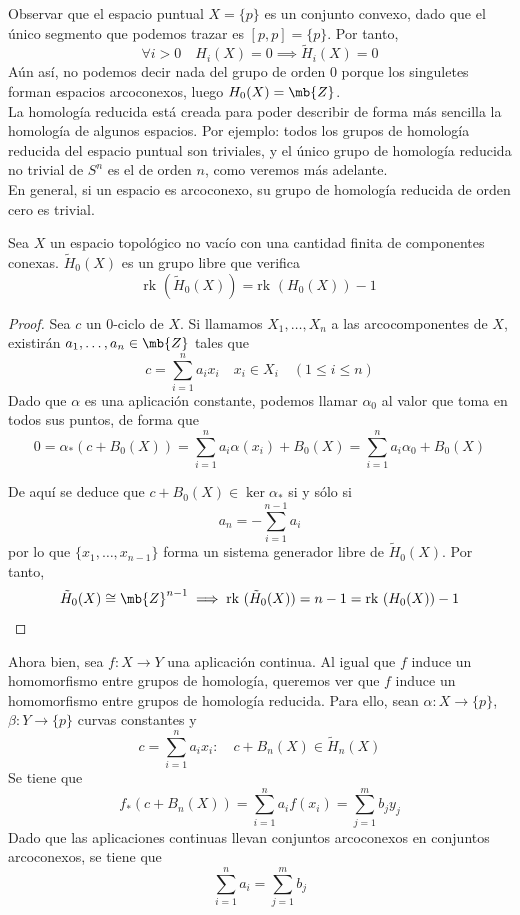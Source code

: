 Observar que el espacio puntual $X=\{p\}$ es un conjunto convexo, dado que el único segmento que podemos trazar es $[p,p]=\{p\}$. Por tanto, $$\forall i > 0 \quad H_i(X)=0 \implies \tilde{H}_i(X) =0$$ Aún así, no podemos decir nada del grupo de orden 0 porque los singuletes forman espacios arcoconexos, luego $H_0(X)=\mb{Z}$.
\\

La homología reducida está creada para poder describir de forma más sencilla la homología de algunos espacios. Por ejemplo: todos los grupos de homología reducida del espacio puntual son triviales, y el único grupo de homología reducida no trivial de $S^n$ es el de orden $n$, como veremos más adelante.
\\

En general, si un espacio es arcoconexo, su grupo de homología reducida de orden cero es trivial.

\begin{prop}
Sea $X$ un espacio topológico no vacío con una cantidad finita de componentes conexas. $\tilde{H}_0(X)$ es un grupo libre que verifica $$\mbox{rk }(\tilde{H}_0(X))=\mbox{rk }(H_0(X))-1$$
\end{prop}

\begin{proof}
Sea $c$ un $0$-ciclo de $X$. Si llamamos $X_1,\dots,X_n$ a las arcocomponentes de $X$, existirán $a_1,\dots,a_n \in \mb{Z}$ tales que $$c=\sum^n_{i=1}a_ix_i \quad x_i \in X_i \quad (1 \leq i \leq n)$$ Dado que $\alpha$ es una aplicación constante, podemos llamar $\alpha_0$ al valor que toma en todos sus puntos, de forma que $$0=\alpha_*(c+B_0(X))=\sum^n_{i=1}a_i\alpha(x_i)+B_0(X)=\sum^n_{i=1}a_i\alpha_0+B_0(X)$$

De aquí se deduce que $c+B_0(X) \in \ker \alpha_*$ si y sólo si $$a_n=-\sum^{n-1}_{i=1}a_i$$ por lo que $\{x_1,\dots,x_{n-1}\}$ forma un sistema generador libre de $\tilde{H}_0(X)$. Por tanto, $$\tilde{H}_0(X) \cong \mb{Z}^{n-1} \implies \mbox{rk }(\tilde{H}_0(X))=n-1=\mbox{rk }(H_0(X))-1$$ 
\end{proof}

Ahora bien, sea $f: X \longrightarrow Y$ una aplicación continua. Al igual que $f$ induce un homomorfismo entre grupos de homología, queremos ver que $f$ induce un homomorfismo entre grupos de homología reducida. Para ello, sean $\alpha: X \longrightarrow \{p\}$, $\beta: Y \longrightarrow \{p\}$ curvas constantes y $$c=\sum^n_{i=1}a_ix_i: \quad c+B_n(X) \in \tilde{H}_n(X)$$ Se tiene que $$f_*(c+B_n(X))=\sum^n_{i=1}a_if(x_i)=\sum^m_{j=1}b_jy_j$$ Dado que las aplicaciones continuas llevan conjuntos arcoconexos en conjuntos arcoconexos, se tiene que $$\sum^n_{i=1}a_i=\sum^m_{j=1}b_j$$

